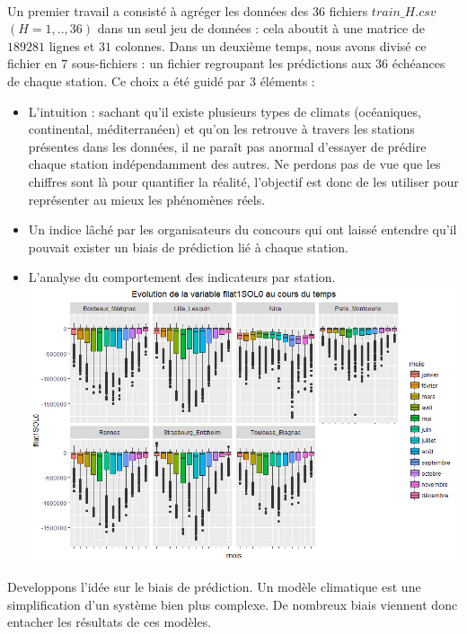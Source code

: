 \documentclass[14pt, openany]{article}
\begin{document}
\paragraph{}
Un premier travail a consisté à agréger les données des 36 fichiers $train\_H.csv$ $(H=1,..,36)$ dans un seul jeu de données : cela aboutit à une matrice de $189 281$ lignes et $31$ colonnes. Dans un deuxième temps, nous avons divisé ce fichier en $7$ sous-fichiers : un fichier regroupant les prédictions aux 36 échéances de chaque station. Ce choix a été guidé par 3 éléments :
\begin{itemize}
\item L'intuition : sachant qu'il existe plusieurs types de climats (océaniques, continental, méditerranéen) et qu'on les retrouve à travers les stations présentes dans les données, il ne paraît pas anormal d'essayer de prédire chaque station indépendamment des autres. Ne perdons pas de vue que les chiffres sont là pour quantifier la réalité, l'objectif est donc de les utiliser pour représenter au mieux les phénomènes réels.
\item Un indice lâché par les organisateurs du concours qui ont laissé entendre qu'il pouvait exister un biais de prédiction lié à chaque station.
\item L'analyse du comportement des indicateurs par station.\\
\includegraphics[width=17cm]{Images/fllat.png}
\begin{center}
\label{fig1}
\end{center}
\end{itemize}
Developpons l'idée sur le biais de prédiction. Un modèle climatique est une simplification d'un système bien plus complexe. De nombreux biais viennent donc entacher les résultats de ces modèles.\\
\end{document}
